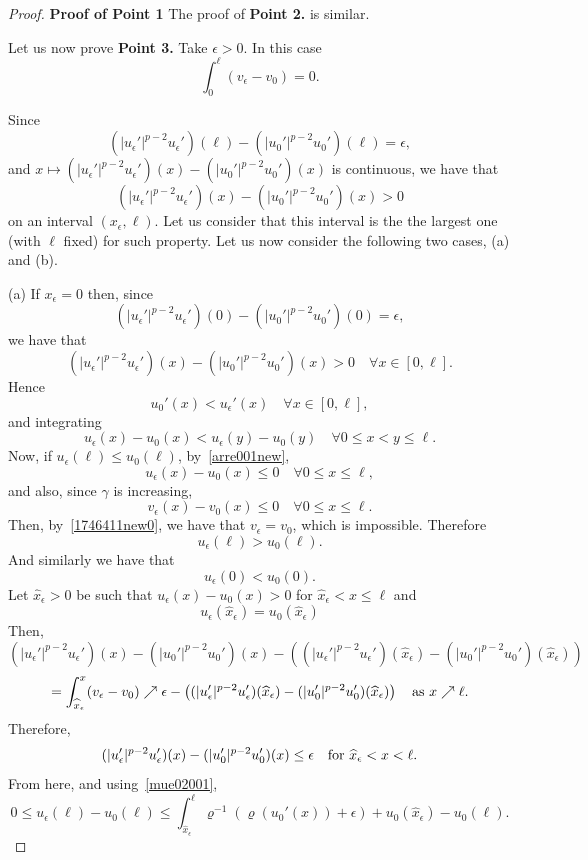 \documentclass[reqno,12pt]{amsart}
\numberwithin{equation}{section} %
\begin{document}
\begin{proof}  {\bf Proof of Point 1}
The proof of {\bf Point 2.} is similar.

 Let us now prove {\bf Point 3.}  Take $\epsilon>0$. 
In this case   \begin{equation}\label{1746411new0}
\int_0^\ell (v_\epsilon-v_0)=0.
\end{equation}

 Since
$$(|u_\epsilon'|^{p-2}u_\epsilon')(\ell)-(|u_0'|^{p-2}u_0')(\ell)=\epsilon,$$
 and $x\mapsto (|u_\epsilon'|^{p-2}u_\epsilon')(x)-(|u_0'|^{p-2}u_0')(x)$ is continuous, we have that
$$(|u_\epsilon'|^{p-2}u_\epsilon')(x)-(|u_0'|^{p-2}u_0')(x)>0$$
on an interval $(x_\epsilon,\ell)$. Let us consider that this interval is the  the largest one (with $\ell$ fixed) for such property.  Let us now  consider the following two cases, (a) and (b).

\noindent (a) If $x_\epsilon=0$ then, since
  $$(|u_\epsilon'|^{p-2}u_\epsilon')(0)-(|u_0'|^{p-2}u_0')(0)=\epsilon,$$  
  we have that
$$(|u_\epsilon'|^{p-2}u_\epsilon')(x)-(|u_0'|^{p-2}u_0')(x)>0\quad\forall x\in[0,\ell].$$
Hence 
\begin{equation}\label{arre002new} u_0'(x) <u_\epsilon'(x)\quad\forall x\in[0,\ell],
\end{equation}
and integrating  
\begin{equation}\label{arre001new}   u_\epsilon(x)-u_0(x)< u_\epsilon(y)-u_0(y)\quad\forall 0\le x<y\le\ell.
\end{equation}
Now, if  $u_\epsilon(\ell)\le u_0(\ell)$,  by~\eqref{arre001new},
$$u_\epsilon(x)-u_0(x)\le 0\quad\forall 0\le x \le\ell,$$
and also, since $\gamma$ is increasing, 
$$v_\epsilon(x)-v_0(x)\le 0 \quad\forall 0\le x \le\ell.$$
Then, by~\eqref{1746411new0},
we have that $v_\epsilon=v_0$, which is impossible. Therefore 
$$u_\epsilon(\ell) >u_0(\ell).$$
And similarly we have that 
$$u_\epsilon(0) <u_0(0).$$
Let $\widehat x_\epsilon>0$  be such that $u_\epsilon(x)-u_0(x)>0$ for  $\widehat x_\epsilon<x\le \ell$
and  
\begin{equation}\label{mue02001}u_\epsilon(\widehat x_\epsilon)=u_0(\widehat x_\epsilon)
\end{equation}
Then, 
$$(|u_\epsilon'|^{p-2}u_\epsilon')(x)-(|u_0'|^{p-2}u_0')(x)-\left((|u_\epsilon'|^{p-2}u_\epsilon')(\widehat x_\epsilon)-(|u_0'|^{p-2}u_0')(\widehat x_\epsilon)\right)$$
$$= \int_{\widehat x_\epsilon}^x(v_\epsilon-v_0) \nearrow \epsilon-\left((|u_\epsilon'|^{p-2}u_\epsilon')(\widehat x_\epsilon)-(|u_0'|^{p-2}u_0')(\widehat x_\epsilon)\right) \quad \hbox{as } x\nearrow \ell.$$
Therefore,
$$(|u_\epsilon'|^{p-2}u_\epsilon')(x)-(|u_0'|^{p-2}u_0')(x)\le  \epsilon \quad \hbox{for } \widehat x_\epsilon<x<\ell.$$
From here, and using~\eqref{mue02001},
\begin{equation}\label{simcas01001}
0\le u_\epsilon(\ell)-u_0(\ell)\le \int_{\widehat x_\epsilon}^\ell\varrho^{-1}\left(\varrho(u_0'(x))+\epsilon\right)+u_0(\widehat x_\epsilon)-u_0(\ell).
\end{equation}



\end{proof}
\end{document}
